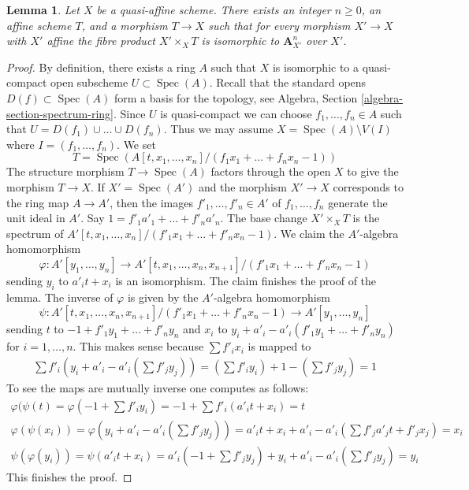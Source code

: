 \documentclass{stacks-project}
\theoremstyle{plain}
\newtheorem{lemma}[subsection]{Lemma}
\theoremstyle{definition}
\theoremstyle{remark}
\numberwithin{equation}{subsection}
\def\Spec{\mathop{\mathrm{Spec}}}
\begin{document}
\begin{lemma}
\label{lemma-quasi-affine-presentation}
Let $X$ be a quasi-affine scheme. There exists an integer $n \geq 0$,
an affine scheme $T$, and a morphism $T \to X$ such that for every
morphism $X' \to X$ with $X'$ affine the fibre product $X' \times_X T$
is isomorphic to $\mathbf{A}^n_{X'}$ over $X'$.
\end{lemma}

\begin{proof}
By definition, there exists a ring $A$ such that $X$ is isomorphic to a
quasi-compact open subscheme $U \subset \Spec(A)$. Recall that the standard
opens $D(f) \subset \Spec(A)$ form a basis for the topology, see
Algebra, Section \ref{algebra-section-spectrum-ring}. Since $U$ is
quasi-compact we can choose $f_1, \ldots, f_n \in A$ such that
$U = D(f_1) \cup \ldots \cup D(f_n)$. Thus we may assume
$X = \Spec(A) \setminus V(I)$ where $I = (f_1, \ldots, f_n)$. We set
$$
T = \Spec(A[t, x_1, \ldots, x_n]/(f_1 x_1 + \ldots + f_n x_n - 1))
$$
The structure morphism $T \to \Spec(A)$ factors through the open $X$
to give the morphism $T \to X$. If $X' = \Spec(A')$ and the morphism
$X' \to X$ corresponds to the ring map $A \to A'$, then the images
$f'_1, \ldots, f'_n \in A'$ of $f_1, \ldots, f_n$
generate the unit ideal in $A'$.
Say $1 = f'_1 a'_1 + \ldots + f'_n a'_n$.
The base change $X' \times_X T$ is the spectrum of
$A'[t, x_1, \ldots, x_n]/(f'_1 x_1 + \ldots + f'_n x_n - 1)$.
We claim the $A'$-algebra homomorphism
$$
\varphi :
A'[y_1, \ldots, y_n]
\longrightarrow
A'[t, x_1, \ldots, x_n, x_{n + 1}]/(f'_1 x_1 + \ldots + f'_n x_n - 1)
$$
sending $y_i$ to $a'_i t + x_i$ is an isomorphism. The claim finishes
the proof of the lemma. The inverse of $\varphi$ is given by the $A'$-algebra
homomorphism
$$
\psi :
A'[t, x_1, \ldots, x_n, x_{n + 1}]/(f'_1 x_1 + \ldots + f'_n x_n - 1)
\longrightarrow
A'[y_1, \ldots, y_n]
$$
sending $t$ to $-1 + f'_1 y_1 + \ldots + f'_n y_n$ and $x_i$ to
$y_i + a'_i - a'_i(f'_1 y_1 + \ldots + f'_n y_n)$ for $i = 1, \ldots, n$.
This makes sense because $\sum f'_ix_i$ is mapped to
$$
\begin{matrix}
\sum f'_i(y_i + a'_i - a'_i(\sum f'_j y_j)) =
(\sum f'_iy_i) + 1 - (\sum f'_j y_j) = 1
\end{matrix}
$$
To see the maps are mutually inverse one computes as follows:
$$
\begin{matrix}
\varphi(\psi(t) = \varphi(-1 +  \sum f'_i y_i) =
-1 + \sum f'_i (a'_i t + x_i) = t \\
\varphi(\psi(x_i)) = \varphi(y_i + a'_i - a'_i(\sum f'_j y_j)) =
a'_i t + x_i + a'_i - a'_i(\sum f'_ja'_jt + f'_jx_j) = x_i \\
\psi(\varphi(y_i)) = \psi(a'_i t + x_i) =
a'_i(-1 + \sum f'_j y_j) + y_i + a'_i - a'_i(\sum f'_j y_j) = y_i
\end{matrix}
$$
This finishes the proof.
\end{proof}
\end{document}
